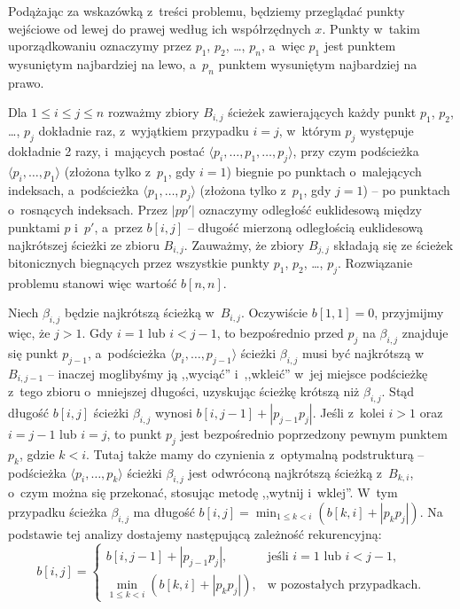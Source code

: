 Podążając za wskazówką z~treści problemu, będziemy przeglądać punkty wejściowe od lewej do prawej według ich współrzędnych $x$.
Punkty w~takim uporządkowaniu oznaczymy przez $p_1$, $p_2$, \dots, $p_n$, a~więc $p_1$ jest punktem wysuniętym najbardziej na lewo, a~$p_n$ punktem wysuniętym najbardziej na prawo.

Dla $1\le i\le j\le n$ rozważmy zbiory $B_{i,j}$ ścieżek zawierających każdy punkt $p_1$, $p_2$, \dots, $p_j$ dokładnie raz, z~wyjątkiem przypadku $i=j$, w~którym $p_j$ występuje dokładnie 2 razy, i~mających postać $\langle p_i,\dots,p_1,\dots,p_j\rangle$, przy czym podścieżka $\langle p_i,\dots,p_1\rangle$ (złożona tylko z~$p_1$, gdy $i=1$) biegnie po punktach o~malejących indeksach, a~podścieżka $\langle p_1,\dots,p_j\rangle$ (złożona tylko z~$p_1$, gdy $j=1$) -- po punktach o~rosnących indeksach.
Przez $|pp'|$ oznaczymy odległość euklidesową między punktami $p$ i~$p'$, a~przez $b[i,j]$ -- długość mierzoną odległością euklidesową najkrótszej ścieżki ze zbioru $B_{i,j}$.
Zauważmy, że zbiory $B_{j,j}$ składają się ze ścieżek bitonicznych biegnących przez wszystkie punkty $p_1$, $p_2$, \dots, $p_j$.
Rozwiązanie problemu stanowi więc wartość $b[n,n]$.

Niech $\beta_{i,j}$ będzie najkrótszą ścieżką w~$B_{i,j}$.
Oczywiście $b[1,1]=0$, przyjmijmy więc, że $j>1$.
Gdy $i=1$ lub $i<j-1$, to bezpośrednio przed $p_j$ na $\beta_{i,j}$ znajduje się punkt $p_{j-1}$, a~podścieżka $\langle p_i,\dots,p_{j-1}\rangle$ ścieżki $\beta_{i,j}$ musi być najkrótszą w~$B_{i,j-1}$ -- inaczej moglibyśmy ją ,,wyciąć'' i~,,wkleić'' w~jej miejsce podścieżkę z~tego zbioru o~mniejszej długości, uzyskując ścieżkę krótszą niż $\beta_{i,j}$.
Stąd długość $b[i,j]$ ścieżki $\beta_{i,j}$ wynosi $b[i,j-1]+|p_{j-1}p_j|$.
Jeśli z~kolei $i>1$ oraz $i=j-1$ lub $i=j$, to punkt $p_j$ jest bezpośrednio poprzedzony pewnym punktem $p_k$, gdzie $k<i$.
Tutaj także mamy do czynienia z~optymalną podstrukturą -- podścieżka $\langle p_i,\dots,p_k\rangle$ ścieżki $\beta_{i,j}$ jest odwróconą najkrótszą ścieżką z~$B_{k,i}$, o~czym można się przekonać, stosując metodę ,,wytnij i~wklej''.
W~tym przypadku ścieżka $\beta_{i,j}$ ma długość $b[i,j]=\min_{1\le k<i}(b[k,i]+|p_kp_j|)$.
Na podstawie tej analizy dostajemy następującą zależność rekurencyjną:
\[
	b[i,j] = \begin{cases}
		b[i,j-1]+|p_{j-1}p_j|, & \text{jeśli $i=1$ lub $i<j-1$}, \\
		\displaystyle\min_{1\le k<i}(b[k,i]+|p_kp_j|), & \text{w~pozostałych przypadkach}.
	\end{cases}
\]

